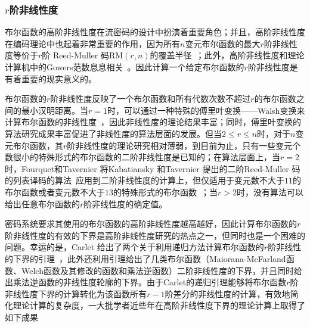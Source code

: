 \documentclass[a4paper,zihao=-4,AutoFakeBold]{ctexart}
\begin{document}
\subsubsection{$r$阶非线性度}
布尔函数的高阶非线性度在流密码的设计中扮演着重要角色；并且，高阶非线性度在编码理论中也起着非常重要的作用，因为所有$n$变元布尔函数的最大$r$阶非线性度等价于$r$阶 Reed-Muller 码$\mathrm{RM}(r, n)$的覆盖半径~\cite{CHLL97}；此外，高阶非线性度和理论计算机中的Gowers范数息息相关~\cite{BKSSZ}。因此计算一个给定布尔函数的$r$阶非线性度是有着重要的现实意义的。

布尔函数的$r$阶非线性度反映了一个布尔函数和所有代数次数不超过$r$的布尔函数之间的最小汉明距离。当$r=1$时，可以通过一种特殊的傅里叶变换——Walsh变换来计算布尔函数的非线性度~\cite{CarletBook2020}，因此非线性度的理论结果丰富；同时，傅里叶变换的算法研究成果丰富促进了非线性度的算法层面的发展。但当$2\le r \le n$时，对于$n$变元布尔函数，其$r$阶非线性度的理论研究相对薄弱，到目前为止，只有一些变元个数很小的特殊形式的布尔函数的二阶非线性度是已知的；在算法层面上，当$r=2$时，Fourquet和Tavernier 将Kabatiansky 和Tavernier 提出的二阶Reed-Muller 码的列表译码的算法~\cite{Kabatiansky-Tavernier07}应用到二阶非线性度的计算上，但仅适用于变元数不大于$11$的布尔函数或者变元数不大于$13$的特殊形式的布尔函数~\cite{Fourquet-Tavernier07}；当$r>2$时，没有算法可以给出任意布尔函数的$r$阶非线性度的确定值。

密码系统要求其使用的布尔函数的高阶非线性度越高越好，因此计算布尔函数的$r$阶非线性度的有效的下界是高阶非线性度研究的热点之一，但同时也是一个困难的问题。幸运的是，Carlet 给出了两个关于利用递归方法计算布尔函数的$r$阶非线性的下界的引理~\cite{CC08IT}，此外还利用引理给出了几类布尔函数（Maiorana-McFarland函数、Welch函数及其修改的函数和乘法逆函数）二阶非线性度的下界，并且同时给出乘法逆函数的非线性度轮廓的下界。由于Carlet的递归引理能够将布尔函数$r$阶非线性度下界的计算转化为该函数所有$r-1$阶差分的非线性度的计算，有效地简化理论计算的复杂度，一大批学者近些年在高阶非线性度下界的理论计算上取得了如下成果
\end{document}
